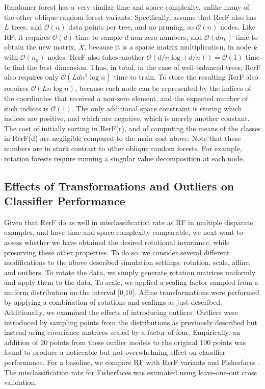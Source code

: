 \documentclass{article} %
\providecommand{\mc}[1]{\mathcal{#1}}
\providecommand{\mt}[1]{\widetilde{#1}}
\begin{document}
Randomer forest has a very similar time and space complexity, unlike many of the other oblique random forest variants.  Specifically, assume that RerF also has $L$ trees, and $\mc O(n)$ data points per tree, and no pruning, so $\mc O(n)$ nodes. Like RF, it requires $\mc{O}(d)$ time to sample $d$ non-zero numbers, and $\mc{O}(dn_k)$ time to obtain the new matrix, $\mt{X}$, because it is a sparse matrix multiplication, in node $k$ with $\mc O(n_k)$ nodes.  RerF also takes another $\mc{O}(d/n\log(d/n))=\mc O(1)$ time to find the best dimension. Thus, in total, in the case of well-balanced trees, RerF also requires only $\mc{O}(Ldn^2\log n)$ time to train.  To store the resulting RerF also requires $\mc{O}(L n\log n )$, because each node can be represented by the indices of the coordinates that received a non-zero element, and the expected number of such indices is $\mc O(1)$.  The only additional space constraint is storing which indices are positive, and which are negative, which is merely another constant.
The cost of initially sorting in RerF(r), and of computing the means of the classes in RerF(d) are negligible compared to the main cost above. Note that these numbers are in stark contrast to other oblique random forests.  For example, rotation forests require running a singular value decomposition at each node.


\subsection{Effects of Transformations and Outliers on Classifier Performance}

Given that RerF do as well in misclassification rate as RF in multiple disparate examples, and have time and space complexity comparable, we next want to assess whether we have obtained the desired rotational invariance, while preserving these other properties.  To do so, we consider several different modifications to the above described simulation settings: rotation, scale, affine, and outliers.  To rotate the data, we simply generate rotation matrices uniformly and apply them to the data.  To scale, we applied a scaling factor sampled from a uniform distribution on the interval [0,10]. 
Affine transformations were performed by applying a combination of rotations and scalings as just described. Additionally, we examined the effects of introducing outliers. Outliers were introduced by sampling points from the distributions as previously described but instead using covariance matrices scaled by a factor of four. Empirically, an addition of 20 points from these outlier models to the original 100 points was found to produce a noticeable but not overwhelming effect on classifier performance. For a baseline, we compare RF with RerF variants and Fisherfaces \cite{Fisherfaces}. The misclassification rate for Fisherfaces was estimated using leave-one-out cross validation.
\end{document}
